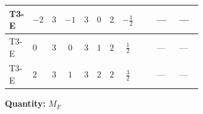 \documentclass[8pt]{article}
\begin{document}
\begin{landscape}
\begin{longtable}{@{}llcccccc >{\raggedright\arraybackslash}p{0.21\linewidth} >{\raggedright\arraybackslash}p{0.21\linewidth} >{\raggedright\arraybackslash}p{0.21\linewidth}@{}}
\midrule
T3-E & $-2$ & $3$ & $-1$ & $3$ & $0$ & $2$ & $-\frac{1}{2}$ & \scriptsize\adjustbox{max width=\linewidth}{$\begin{gathered} \frac{3}{4} (\left(\left({y_1}\right)^{T}\,\left({y_1}\right)^{*}\,{M_F}\right)_{ij}+\left({M_F}\,\left({y_2}\right)^{\dagger}\,{y_2}\right)_{ij})\end{gathered}$} & --- & --- \\
\midrule
T3-E & $0$ & $3$ & $0$ & $3$ & $1$ & $2$ & $\frac{1}{2}$ & \scriptsize\adjustbox{max width=\linewidth}{$\begin{gathered} \frac{3}{4} (\left(\left({y_1}\right)^{T}\,\left({y_1}\right)^{*}\,{M_F}\right)_{ij}+\left({M_F}\,\left({y_2}\right)^{\dagger}\,{y_2}\right)_{ij})\end{gathered}$} & --- & --- \\
\midrule
T3-E & $2$ & $3$ & $1$ & $3$ & $2$ & $2$ & $\frac{3}{2}$ & \scriptsize\adjustbox{max width=\linewidth}{$\begin{gathered} \frac{3}{4} (\left(\left({y_1}\right)^{T}\,\left({y_1}\right)^{*}\,{M_F}\right)_{ij}+\left({M_F}\,\left({y_2}\right)^{\dagger}\,{y_2}\right)_{ij})\end{gathered}$} & --- & --- \\
\midrule
\bottomrule
\end{longtable}
\clearpage
\noindent\textbf{Quantity: }$M_F$\par\smallskip

\end{landscape}
\end{document}
